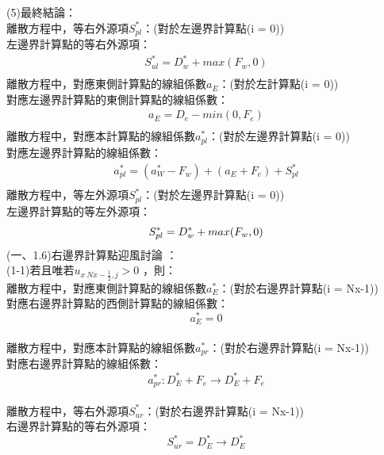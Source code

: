 \documentclass[12pt]{article}
\begin{document}
\noindent (5)最終結論：\\
離散方程中，等右外源項$S_{pl}^{*}$：(對於左邊界計算點(i = 0))\\
左邊界計算點的等右外源項：\\
\begin{equation}
    \begin{split}
        S_{ul}^{*} = D_{w}^{*} + max(F_{w},0)\\
    \end{split}
\end{equation}
\noindent 離散方程中，對應東側計算點的線組係數$a_{E}$：(對於左計算點(i = 0))\\
對應左邊界計算點的東側計算點的線組係數：\\
\begin{equation}
    \begin{split}
        a_{E} = D_{e} - min(0,F_{e})\\
    \end{split}
\end{equation}
\noindent 離散方程中，對應本計算點的線組係數$a_{pl}^{*}$：(對於左邊界計算點(i = 0))\\
對應左邊界計算點的線組係數：\\
\begin{equation}
    \begin{split}
        a_{pl}^{*} = (a_{W}^{*}-F_{w}) + (a_{E} + F_{e}) + S_{pl}^{*}\\
    \end{split}
\end{equation}
\noindent 離散方程中，等左外源項$S_{pl}^{*}$：(對於左邊界計算點(i = 0))\\
左邊界計算點的等左外源項：\\
\begin{equation}
    S_{pl}^{*} = D_{w}^{*} + max(F_{w},0)\\
\end{equation}
\noindent (一、1.6)右邊界計算點迎風討論 ：\\


\noindent (1-1)若且唯若$u_{x\ Nx-\frac{1}{2} ,j} > 0$ ，則：\\
離散方程中，對應東側計算點的線組係數$a_{E}^{*}$：(對於右邊界計算點(i = Nx-1))\\
對應右邊界計算點的西側計算點的線組係數：\\
$$a_{E}^{*} = 0$$\\
離散方程中，對應本計算點的線組係數$a_{pr}^{*}$：(對於右邊界計算點(i = Nx-1))\\
對應右邊界計算點的線組係數：\\
$$a_{pr}^{*} : D_{E}^{*} + F_{e} \rightarrow D_{E}^{*} + F_{e}$$\\
離散方程中，等右外源項$S_{ur}^{*}$：(對於右邊界計算點(i = Nx-1))\\
右邊界計算點的等右外源項：\\
$$S_{ur}^{*} = D_{E}^{*} \rightarrow D_{E}^{*} $$\\
\end{document}
